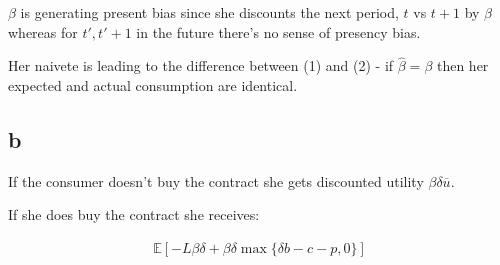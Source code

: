 \documentclass{article}
\begin{document}
$\beta$ is generating present bias since she discounts the next period, $t$ vs 
$t+1$ by $\beta$ whereas for $t', t'+1$ in the future there's no sense of 
presency bias.


Her naivete is leading to the difference between (1) and (2) - if $\hat{\beta} = \beta$
then her expected and actual consumption are identical.


\subsection*{b}


If the consumer doesn't buy the contract she gets discounted utility $\beta \delta \overline{u}$.

If she does buy the contract she receives:

\begin{align*}
    \mathbb{E}\left[ 
        -L\beta \delta + \beta \delta \max\{\delta b - c - p, 0\}
    \right]
\end{align*}
\end{document}
